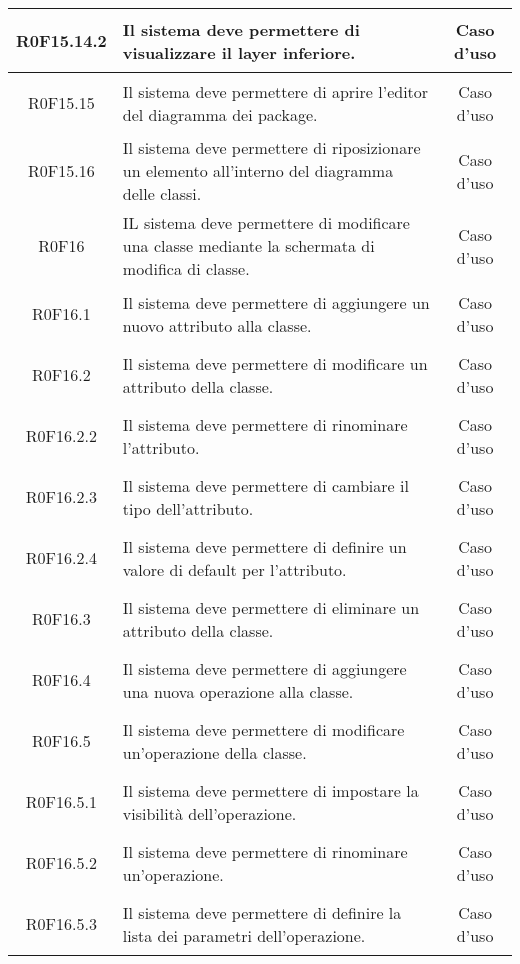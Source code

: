 \documentclass[../AnalisiDeiRequisiti.tex]{subfiles}
\begin{document}
\begin{longtable}{|c|>{\centering}p{7cm}|c|}
\hypertarget{R0F15.14.2}{R0F15.14.2} & Il sistema deve permettere di visualizzare il layer inferiore. & Caso d'uso \\ \hline
\hypertarget{R0F15.15}{R0F15.15} & Il sistema deve permettere di aprire l'editor del diagramma dei package. & Caso d'uso \\ \hline
\hypertarget{R0F15.16}{R0F15.16} & Il sistema deve permettere di riposizionare un elemento all'interno del diagramma delle classi. & Caso d'uso \\ \hline
\hypertarget{R0F16}{R0F16} & IL sistema deve permettere di modificare una classe mediante la schermata di modifica di classe. & Caso d'uso \\ \hline
\hypertarget{R0F16.1}{R0F16.1} & Il sistema deve permettere di aggiungere un nuovo attributo alla classe. & Caso d'uso \\ \hline
\hypertarget{R0F16.2}{R0F16.2} & Il sistema deve permettere di modificare un attributo della classe. & Caso d'uso \\ \hline
\hypertarget{R0F16.2.2}{R0F16.2.2} & Il sistema deve permettere di rinominare l'attributo. & Caso d'uso \\ \hline
\hypertarget{R0F16.2.3}{R0F16.2.3} & Il sistema deve permettere di cambiare il tipo dell'attributo. & Caso d'uso \\ \hline
\hypertarget{R0F16.2.4}{R0F16.2.4} & Il sistema deve permettere di definire un valore di default per l'attributo. & Caso d'uso \\ \hline
\hypertarget{R0F16.3}{R0F16.3} & Il sistema deve permettere di eliminare un attributo della classe. & Caso d'uso \\ \hline
\hypertarget{R0F16.4}{R0F16.4} & Il sistema deve permettere di aggiungere una nuova operazione alla classe. & Caso d'uso \\ \hline
\hypertarget{R0F16.5}{R0F16.5} & Il sistema deve permettere di modificare un'operazione della classe. & Caso d'uso \\ \hline
\hypertarget{R0F16.5.1}{R0F16.5.1} & Il sistema deve permettere di impostare la visibilità dell'operazione. & Caso d'uso \\ \hline
\hypertarget{R0F16.5.2}{R0F16.5.2} & Il sistema deve permettere di rinominare un'operazione.  & Caso d'uso \\ \hline
\hypertarget{R0F16.5.3}{R0F16.5.3} & Il sistema deve permettere di definire la lista dei parametri dell'operazione. & Caso d'uso \\ \hline

\end{longtable}
\end{document}
